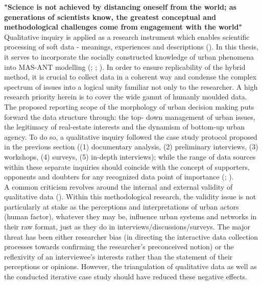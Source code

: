 \documentclass[11pt]{report}
\begin{document}
\textbf{"Science is not achieved  by distancing oneself from  the world; as  generations of scientists  know,  the greatest conceptual and methodological challenges come from  engagement with the world" \href{Whyte}{\citealt{whyte_participatory_1991}}}
\\

Qualitative inquiry is applied as a research instrument which enables scientific processing of soft data - meanings, experiences and descriptions (\href{Yin}{\citealt{yin_case_2003}}).
In this thesis, it serves to incorporate the socially constructed knowledge of urban phenomena into MAS-ANT modelling (\href{Mertens}{\citealt{mertens_introduction_1998}}; \href{Flick}{\citealt{flick_introduction_2009}}; \href{Grubovic}{\citealt{grubovic_belgrade_2006}}).
In order to ensure replicability of the hybrid method, it is crucial to collect data in a coherent way and condense the complex spectrum of issues into a logical unity familiar not only to the researcher. A high research priority herein is to cover the wide gamut of humanly moulded data. The proposed reporting scope of the morphology of urban decision making puts forward the data structure through: the top- down management of urban issues, the legitimacy of real-estate interests and the dynamism of bottom-up urban agency. To do so, a qualitative inquiry followed the case study protocol proposed in the previous section ((1) documentary analysis, (2) preliminary interviews, (3) workshops, (4) surveys, (5) in-depth interviews); while the range of data sources within these separate inquiries should coincide with the concept of supporters, opponents and doubters for any recognized data point of importance (\href{Pettigrew}{\citealt{pettigrew_character_1992}}; \href{Harrison}{\citealt{partington_case_2002}}). 
\\

A common criticism revolves around the internal and external validity of qualitative data (\href{Flyvbjerg}{\citealt{flyvbjerg_five_2006}}). Within this methodological research, the validity issue is not particularly at stake as the perceptions and interpretations of urban actors (human factor), whatever they may be, influence urban systems and networks in their raw format, just as they do in interviews/discussions/surveys. The major threat has been either researcher bias (in directing the interactive data collection processes towards confirming the researcher’s preconceived notion) or the reflexivity of an interviewee’s interests rather than the statement of their perceptions or opinions. However, the triangulation of qualitative data as well as the conducted iterative case study should have reduced these negative effects.
\\
\end{document}

